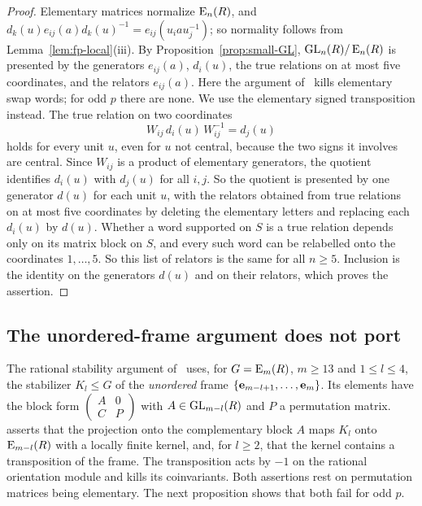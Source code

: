 \begin{proof}
Elementary matrices normalize $\operatorname{E}_n(R)$, and $d_k(u)e_{ij}(a)d_k(u)^{-1}=e_{ij}(u_iau_j^{-1})$; so normality follows
from Lemma~\ref{lem:fp-local}(iii). By Proposition~\ref{prop:small-GL}, $\operatorname{GL}_n(R)/\operatorname{E}_n(R)$ is presented by the generators
$e_{ij}(a)$, $d_i(u)$, the true relations on at most five coordinates, and the relators $e_{ij}(a)$. Here the argument
of~\cite{OAI247periodic} kills elementary swap words; for odd $p$ there are none. We use the elementary signed
transposition instead. The true relation on two coordinates
\[
 W_{ij}\,d_i(u)\,W_{ij}^{-1}=d_j(u)
\]
holds for every unit $u$, even for $u$ not central, because the two signs it involves are central. Since $W_{ij}$ is a
product of elementary generators, the quotient identifies $d_i(u)$ with $d_j(u)$ for all $i,j$. So the quotient is
presented by one generator $d(u)$ for each unit $u$, with the relators obtained from true relations on at most five
coordinates by deleting the elementary letters and replacing each $d_i(u)$ by $d(u)$. Whether a word supported on $S$
is a true relation depends only on its matrix block on $S$, and every such word can be relabelled onto the coordinates
$1,\dots,5$. So this list of relators is the same for all $n\geq5$. Inclusion is the identity on the generators $d(u)$
and on their relators, which proves the assertion.
\end{proof}

\subsection{The unordered-frame argument does not port}

The rational stability argument of~\cite{OAI247periodic} uses, for $G=\operatorname{E}_m(R)$, $m\geq13$ and $1\leq l\leq4$, the
stabilizer $K_l\leq G$ of the \emph{unordered} frame $\{\mathbf e_{m-l+1},\dots,\mathbf e_m\}$. Its elements have the block form
$\left(\begin{smallmatrix}A&0\\C&P\end{smallmatrix}\right)$ with $A\in\operatorname{GL}_{m-l}(R)$ and $P$ a permutation matrix.
\cite[Lemma~5.9]{OAI247periodic} asserts that the projection onto the complementary block $A$ maps $K_l$ onto
$\operatorname{E}_{m-l}(R)$ with a locally finite kernel, and, for $l\geq2$, that the kernel contains a transposition of the frame. The transposition acts
by $-1$ on the rational orientation module and kills its coinvariants. Both assertions rest on permutation matrices
being elementary. The next proposition shows that both fail for odd $p$.


